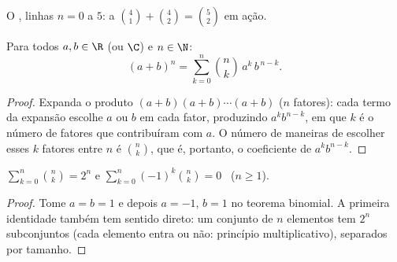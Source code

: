\begin{omfigure}

{\small O , linhas $n = 0$ a $5$: a 
$\binom{4}{1} + \binom{4}{2} = \binom{5}{2}$ em ação.}
\end{omfigure}

\begin{theorem}\label{thm:g12:comb:binomial}
Para todos $a, b \in \R$ (ou $\C$) e $n \in \N$:
\[
(a+b)^n = \sum_{k=0}^{n} \binom{n}{k}\, a^{k}\, b^{\,n-k} .
\]
\end{theorem}

\begin{proof}
Expanda o produto $(a+b)(a+b)\cdots(a+b)$ ($n$ fatores): cada termo da
expansão escolhe $a$ ou $b$ em cada fator, produzindo $a^k b^{n-k}$, em que
$k$ é o número de fatores que contribuíram com $a$. O número de maneiras de
escolher esses $k$ fatores entre $n$ é $\binom nk$, que é, portanto, o
coeficiente de $a^k b^{n-k}$.
\end{proof}

\begin{corollary}\label{cor:g12:comb:sums}
$\displaystyle\sum_{k=0}^{n} \binom{n}{k} = 2^n$
\quad e \quad
$\displaystyle\sum_{k=0}^{n} (-1)^k\binom{n}{k} = 0$ \ ($n \geq 1$).
\end{corollary}

\begin{proof}
Tome $a = b = 1$ e depois $a = -1$, $b = 1$ no teorema binomial. A primeira
identidade também tem sentido direto: um conjunto de $n$ elementos tem
$2^n$ subconjuntos (cada elemento entra ou não: princípio multiplicativo),
separados por tamanho.
\end{proof}

